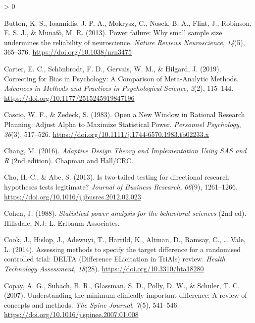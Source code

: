 \documentclass[
  english,
  ,jou,floatsintext]{apa6}
\newlength{\cslhangindent}
\newenvironment{CSLReferences}[2] %
 {%
  \setlength{\parindent}{0pt}
  \ifodd #1 \everypar{\setlength{\hangindent}{\cslhangindent}}\ignorespaces\fi
  \ifnum #2 > 0
  \setlength{\parskip}{#2\baselineskip}
  \fi
 }%
 {}
\begin{document}
\begin{CSLReferences}{1}{0}
\leavevmode\hypertarget{ref-button_power_2013}{}%
Button, K. S., Ioannidis, J. P. A., Mokrysz, C., Nosek, B. A., Flint, J., Robinson, E. S. J., \& Munafò, M. R. (2013). Power failure: Why small sample size undermines the reliability of neuroscience. \emph{Nature Reviews Neuroscience}, \emph{14}(5), 365--376. \url{https://doi.org/10.1038/nrn3475}

\leavevmode\hypertarget{ref-carter_correcting_2019}{}%
Carter, E. C., Schönbrodt, F. D., Gervais, W. M., \& Hilgard, J. (2019). Correcting for {Bias} in {Psychology}: {A Comparison} of {Meta-Analytic Methods}. \emph{Advances in Methods and Practices in Psychological Science}, \emph{2}(2), 115--144. \url{https://doi.org/10.1177/2515245919847196}

\leavevmode\hypertarget{ref-cascio_open_1983}{}%
Cascio, W. F., \& Zedeck, S. (1983). Open a {New Window} in {Rational Research Planning}: {Adjust Alpha} to {Maximize Statistical Power}. \emph{Personnel Psychology}, \emph{36}(3), 517--526. \url{https://doi.org/10.1111/j.1744-6570.1983.tb02233.x}

\leavevmode\hypertarget{ref-chang_adaptive_2016}{}%
Chang, M. (2016). \emph{Adaptive {Design Theory} and {Implementation Using SAS} and {R}} (2nd edition). {Chapman and Hall/CRC}.

\leavevmode\hypertarget{ref-cho_is_2013}{}%
Cho, H.-C., \& Abe, S. (2013). Is two-tailed testing for directional research hypotheses tests legitimate? \emph{Journal of Business Research}, \emph{66}(9), 1261--1266. \url{https://doi.org/10.1016/j.jbusres.2012.02.023}

\leavevmode\hypertarget{ref-cohen_statistical_1988}{}%
Cohen, J. (1988). \emph{Statistical power analysis for the behavioral sciences} (2nd ed). {Hillsdale, N.J}: {L. Erlbaum Associates}.

\leavevmode\hypertarget{ref-cook_assessing_2014}{}%
Cook, J., Hislop, J., Adewuyi, T., Harrild, K., Altman, D., Ramsay, C., \ldots{} Vale, L. (2014). Assessing methods to specify the target difference for a randomised controlled trial: {DELTA} ({Difference ELicitation} in {TriAls}) review. \emph{Health Technology Assessment}, \emph{18}(28). \url{https://doi.org/10.3310/hta18280}

\leavevmode\hypertarget{ref-copay_understanding_2007}{}%
Copay, A. G., Subach, B. R., Glassman, S. D., Polly, D. W., \& Schuler, T. C. (2007). Understanding the minimum clinically important difference: A review of concepts and methods. \emph{The Spine Journal}, \emph{7}(5), 541--546. \url{https://doi.org/10.1016/j.spinee.2007.01.008}


\end{CSLReferences}
\end{document}
